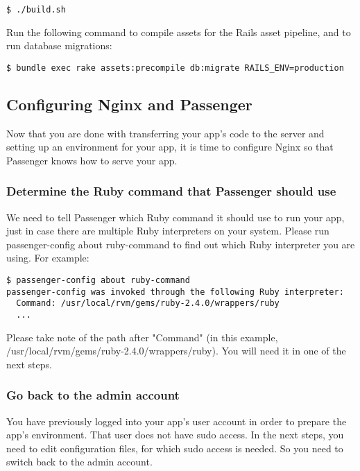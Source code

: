 \documentclass[11pt]{article}
\begin{document}
\begin{verbatim}
$ ./build.sh
\end{verbatim}

Run the following command to compile assets for the Rails asset pipeline, and to run database migrations:
\begin{verbatim}
$ bundle exec rake assets:precompile db:migrate RAILS_ENV=production
\end{verbatim}

\subsection{Configuring Nginx and Passenger}
\label{sec:org750542b}

Now that you are done with transferring your app's code to the server and setting up an environment for your app, it is time to configure Nginx so that Passenger knows how to serve your app.

\subsubsection{Determine the Ruby command that Passenger should use}
\label{sec:org45c3408}

We need to tell Passenger which Ruby command it should use to run your app, just in case there are multiple Ruby interpreters on your system. Please run passenger-config about ruby-command to find out which Ruby interpreter you are using. For example:

\begin{verbatim}
$ passenger-config about ruby-command
passenger-config was invoked through the following Ruby interpreter:
  Command: /usr/local/rvm/gems/ruby-2.4.0/wrappers/ruby
  ...
\end{verbatim}

Please take note of the path after "Command" (in this example, /usr/local/rvm/gems/ruby-2.4.0/wrappers/ruby). You will need it in one of the next steps.

\subsubsection{Go back to the admin account}
\label{sec:org4062898}

You have previously logged into your app's user account in order to prepare the app's environment. That user does not have sudo access. In the next steps, you need to edit configuration files, for which sudo access is needed. So you need to switch back to the admin account.
\end{document}
